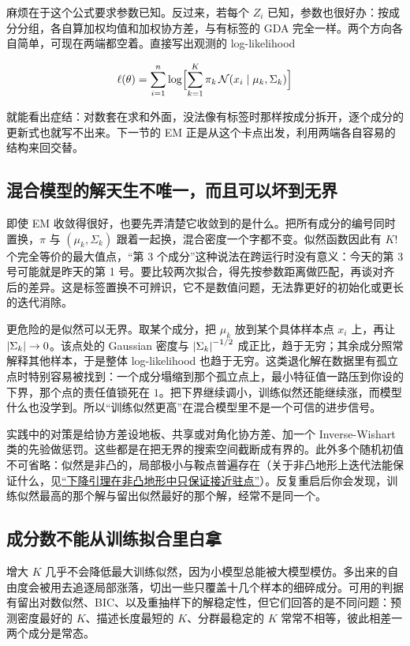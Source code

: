 麻烦在于这个公式要求参数已知。反过来，若每个 \(Z_i\) 已知，参数也很好办：按成分分组，各自算加权均值和加权协方差，与有标签的 GDA 完全一样。两个方向各自简单，可现在两端都空着。直接写出观测的 log-likelihood

\[
\ell(\theta)=\sum_{i=1}^n\log\Bigl[\sum_{k=1}^K\pi_k\,\mathcal N(x_i\mid\mu_k,\Sigma_k)\Bigr]
\]

就能看出症结：对数套在求和外面，没法像有标签时那样按成分拆开，逐个成分的更新式也就写不出来。下一节的 EM 正是从这个卡点出发，利用两端各自容易的结构来回交替。

\subsection{混合模型的解天生不唯一，而且可以坏到无界}

即使 EM 收敛得很好，也要先弄清楚它收敛到的是什么。把所有成分的编号同时置换，\(\pi\) 与 \((\mu_k,\Sigma_k)\) 跟着一起换，混合密度一个字都不变。似然函数因此有 \(K!\) 个完全等价的最大值点，``第 3 个成分''这种说法在跨运行时没有意义：今天的第 3 号可能就是昨天的第 1 号。要比较两次拟合，得先按参数距离做匹配，再谈对齐后的差异。这是标签置换不可辨识，它不是数值问题，无法靠更好的初始化或更长的迭代消除。

更危险的是似然可以无界。取某个成分，把 \(\mu_k\) 放到某个具体样本点 \(x_i\) 上，再让 \(\left|\Sigma_k\right|\to0\)。该点处的 Gaussian 密度与 \(\left|\Sigma_k\right|^{-1/2}\) 成正比，趋于无穷；其余成分照常解释其他样本，于是整体 log-likelihood 也趋于无穷。这类退化解在数据里有孤立点时特别容易被找到：一个成分塌缩到那个孤立点上，最小特征值一路压到你设的下界，那个点的责任值锁死在 \(1\)。把下界继续调小，训练似然还能继续涨，而模型什么也没学到。所以``训练似然更高''在混合模型里不是一个可信的进步信号。

实践中的对策是给协方差设地板、共享或对角化协方差、加一个 Inverse-Wishart 类的先验做惩罚。这些都是在把无界的搜索空间截断成有界的。此外多个随机初值不可省略：似然是非凸的，局部极小与鞍点普遍存在（关于非凸地形上迭代法能保证什么，见\hyperref[sec:09-Convex-Optimization/08-Nonconvex-and-Stochastic-Optimization/01]{``下降引理在非凸地形中只保证接近驻点''}）。反复重启后你会发现，训练似然最高的那个解与留出似然最好的那个解，经常不是同一个。

\subsection{成分数不能从训练拟合里白拿}

增大 \(K\) 几乎不会降低最大训练似然，因为小模型总能被大模型模仿。多出来的自由度会被用去追逐局部涨落，切出一些只覆盖十几个样本的细碎成分。可用的判据有留出对数似然、BIC、以及重抽样下的解稳定性，但它们回答的是不同问题：预测密度最好的 \(K\)、描述长度最短的 \(K\)、分群最稳定的 \(K\) 常常不相等，彼此相差一两个成分是常态。

